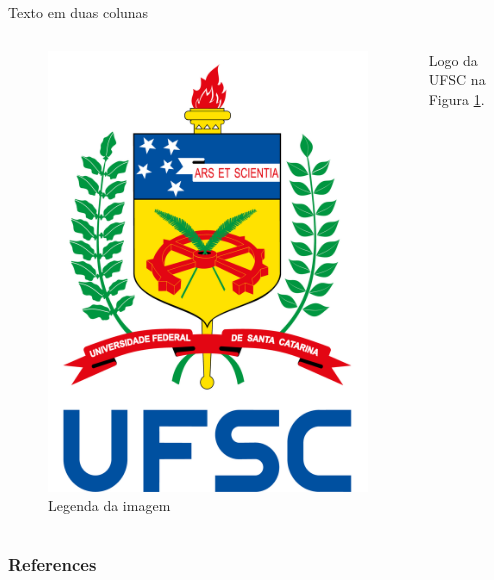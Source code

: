 \documentclass[t]{beamer}
\begin{document}
\begin{frame}{Texto em duas colunas}
\begin{columns}[c]
\begin{column}{.5\textwidth}
\begin{figure}[!ht]
\centering
\includegraphics[scale=.2]{logo.png}
\caption{Legenda da imagem}
\label{fig:rotulo}
\end{figure}
\end{column}
\begin{column}{.5\textwidth}
Logo da UFSC na Figura \ref{fig:rotulo}.
\end{column}
\end{columns}
\end{frame}

\begin{frame}[allowframebreaks]
    \frametitle{References}
    \printbibliography
\end{frame}
\end{document}
